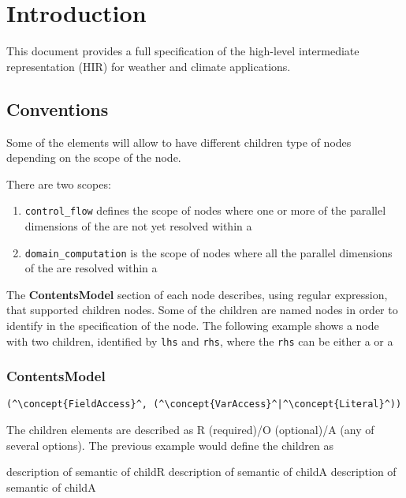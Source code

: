 \section{Introduction}


This document provides a full specification of the high-level intermediate representation (HIR) for weather and climate applications.

\subsection{Conventions}

Some of the elements will allow to have different children type of nodes depending on the scope of the node.

There are two scopes: 
\begin{enumerate}
	\item {\tt control\_flow} defines the scope of nodes where one or more of the parallel dimensions of the  are not yet resolved within a 
	\item {\tt domain\_computation} is the scope of nodes where all the parallel dimensions of the  are resolved within a 
\end{enumerate}

The {\bf ContentsModel} section of each node describes, using regular expression, that supported children nodes. 
Some of the children are named nodes in order to identify in the specification of the node. The following example shows
a node with two children, identified by {\tt lhs} and {\tt rhs}, where the {\tt rhs} can be either a  or a  

\subsubsection*{ContentsModel}{}

\begin{lstlisting}[style=default,frame=none]
(^\concept{FieldAccess}^, (^\concept{VarAccess}^|^\concept{Literal}^))
\end{lstlisting}

The children elements are described as R (required)/O (optional)/A (any of several options).
The previous example would define the children as 

\begin{HIRChildElements}
	{description of semantic of child}{R}
	{description of semantic of child}{A}
	{description of semantic of child}{A}
\end{HIRChildElements}
